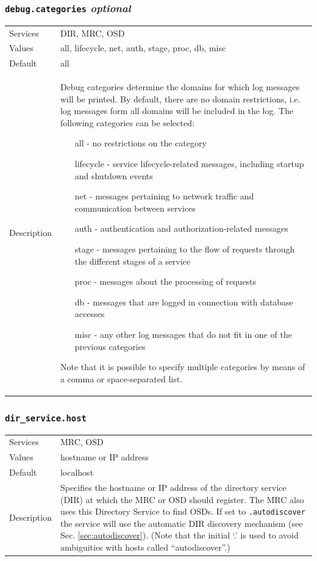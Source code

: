 \documentclass[a4paper,10pt]{book}
\begin{document}
\subsubsection{\texttt{debug.categories} \textit{optional}}
\begin{tabular}{lp{10cm}}
 Services & DIR, MRC, OSD\\
 Values   & all, lifecycle, net, auth, stage, proc, db, misc \\
 Default  & all \\
 Description & Debug categories determine the domains for which log messages will be printed. By default, there are no domain restrictions, i.e. log messages form all domains will be included in the log. The following categories can be selected:
\begin{itemize}
 \item[all -] no restrictions on the category
 \item[lifecycle -] service lifecycle-related messages, including startup and shutdown events
 \item[net -] messages pertaining to network traffic and communication between services
 \item[auth -] authentication and authorization-related messages
 \item[stage -] messages pertaining to the flow of requests through the different stages of a service
 \item[proc -] messages about the processing of requests
 \item[db -] messages that are logged in connection with database accesses
 \item[misc -] any other log messages that do not fit in one of the previous categories
\end{itemize}
Note that it is possible to specify multiple categories by means of a comma or space-separated list.
\end{tabular}

\subsubsection{\texttt{dir\_service.host}}
\begin{tabular}{lp{10cm}}
 Services & MRC, OSD\\
 Values   & hostname or IP address \\
 Default  & localhost \\
 Description & Specifies the hostname or IP address of the directory service (DIR) at which the MRC or OSD should register. The MRC also uses this Directory Service to find OSDs. If set to \texttt{.autodiscover} the service will use the automatic DIR discovery mechanism (see Sec. \ref{sec:autodiscover}). (Note that the initial `.' is used to avoid ambiguities with hosts called ``autodiscover''.)
\end{tabular}
\end{document}
